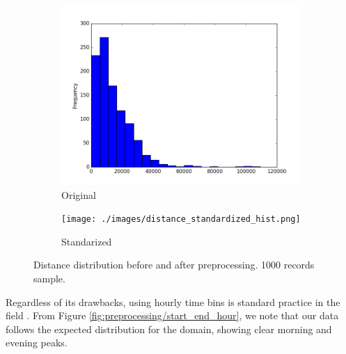 \documentclass{article}
\begin{document}
\begin{figure}[H]
  \centering
  \begin{subfigure}[b]{.45\textwidth}
  	\centering
  	\includegraphics[width=\linewidth]{./images/distance_hist.png}
  	\caption{Original}
  \end{subfigure}
  \begin{subfigure}[b]{.45\textwidth}
  	\centering
  	\texttt{[image: ./images/distance\_standardized\_hist.png]}
  	\caption{Standarized}
  \end{subfigure}
  \caption{Distance distribution before and after preprocessing. 1000 records sample.}
  	\label{fig:preprocessing/distance}
\end{figure}
 

Regardless of its drawbacks, using hourly time bins is standard practice in the field \cite{langlois2016inferring} \cite{ma2017understanding} \cite{morency2007measuring}. From Figure \ref{fig:preprocessing/start_end_hour}, we note that our data follows the expected distribution for the domain, showing clear morning and evening peaks. 
\end{document}
